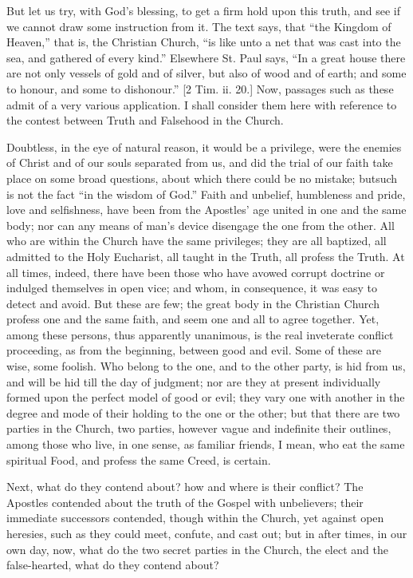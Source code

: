 But let us try, with God's blessing, to get a firm hold upon this
truth, and see if we cannot draw some instruction from it. The text
says, that ``the Kingdom of Heaven,'' that is, the Christian
Church, ``is like unto a net that was cast into the sea, and
gathered of every kind.'' Elsewhere St. Paul says, ``In a
great house there are not only vessels of gold and of silver, but also
of wood and of earth; and some to honour, and some to dishonour.''
[2 Tim. ii. 20.] Now, passages such as these admit of a very various
application. I shall consider them here with reference to the contest
between Truth and Falsehood in the Church.

Doubtless, in the eye of natural reason, it would be a privilege,
were the enemies of Christ and of our souls separated from us, and did
the trial of our faith take place on some broad questions, about which
there could be no mistake; but\emph{}such is not the fact ``in
the wisdom of God.'' Faith and unbelief, humbleness and pride,
love and selfishness, have been from the Apostles' age united in one
and the same body; nor can any means of man's device disengage the
one from the other. All who are within the Church have the same
privileges; they are all baptized, all admitted to the Holy Eucharist,
all taught in the Truth, all profess the Truth. At all times, indeed,
there have been those who have avowed corrupt doctrine or indulged
themselves in open vice; and whom, in consequence, it was easy to
detect and avoid. But these are few; the great body in the Christian
Church profess one and the same faith, and seem one and all to agree
together. Yet, among these persons, thus apparently unanimous, is the
real inveterate conflict proceeding, as from the beginning, between
good and evil. Some of these are wise, some foolish. Who belong to the
one, and to the other party, is hid from us, and will be hid till the
day of judgment; nor are they at present individually formed upon the
perfect model of good or evil; they vary one with another in the
degree and mode of their holding to the one or the other; but that
there are two parties in the Church, two parties, however vague and
indefinite their outlines, among those who live, in one sense, as
familiar friends, I mean, who eat the same spiritual Food, and profess
the same Creed, is certain.

Next, what do they contend about? how and where is their conflict?
The Apostles contended about the truth of the Gospel with unbelievers;
their immediate successors contended, though within the Church, yet
against open heresies, such as they could meet, confute, and cast out;
but in after times, in our own day, now, what do the two secret
parties in the Church, the elect and the false-hearted, what do they
contend about?

